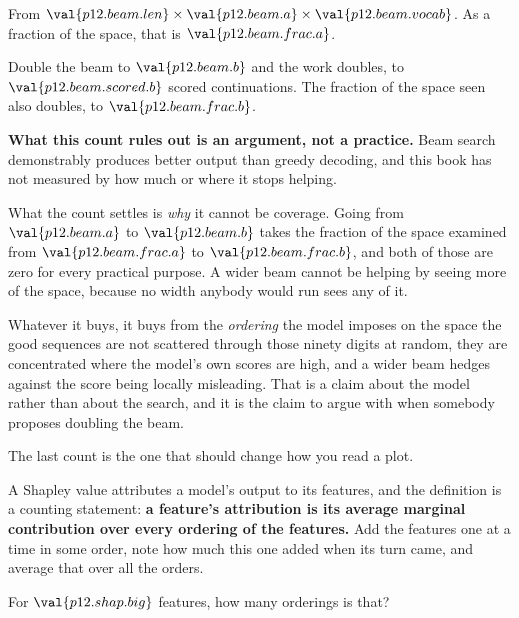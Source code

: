\begin{fr}
From $\val{p12.beam.len} \times \val{p12.beam.a} \times \val{p12.beam.vocab}$.
As a fraction of the space, that is $\val{p12.beam.frac.a}$.

Double the beam to $\val{p12.beam.b}$ and the work doubles, to
$\val{p12.beam.scored.b}$ scored continuations. The fraction of the space seen
also doubles, to $\val{p12.beam.frac.b}$.

\begin{warning}
\textbf{What this count rules out is an argument, not a practice.} Beam search
demonstrably produces better output than greedy decoding, and this book has
not measured by how much or where it stops helping.

What the count settles is \emph{why} it cannot be coverage. Going from
$\val{p12.beam.a}$ to $\val{p12.beam.b}$ takes the fraction of the space
examined from $\val{p12.beam.frac.a}$ to $\val{p12.beam.frac.b}$, and both of
those are zero for every practical purpose. A wider beam cannot be helping by
seeing more of the space, because no width anybody would run sees any of it.

Whatever it buys, it buys from the \emph{ordering} the model imposes on the
space \dash{} the good sequences are not scattered through those ninety digits
at random, they are concentrated where the model's own scores are high, and a
wider beam hedges against the score being locally misleading. That is a claim
about the model rather than about the search, and it is the claim to argue
with when somebody proposes doubling the beam.
\end{warning}
\end{fr}

\begin{fr}
The last count is the one that should change how you read a plot.

A Shapley value attributes a model's output to its features, and the
definition is a counting statement: \textbf{a feature's attribution is its
average marginal contribution over every ordering of the features.} Add the
features one at a time in some order, note how much this one added when its
turn came, and average that over all the orders.

For $\val{p12.shap.big}$ features, how many orderings is that?
\dotline
\nextframe
\end{fr}

